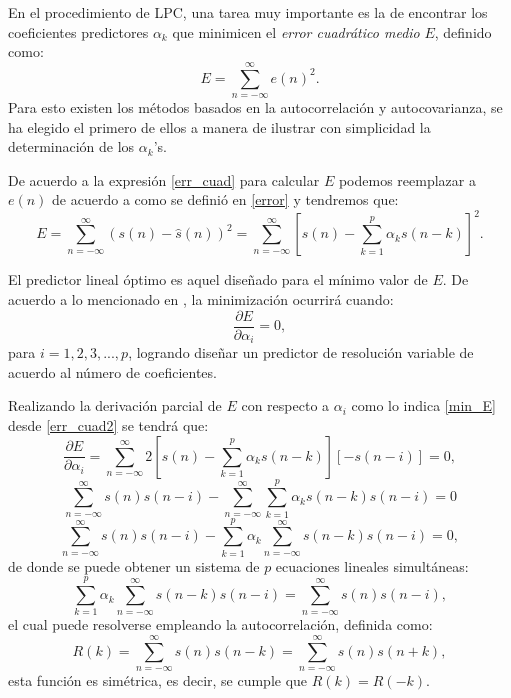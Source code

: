 En el procedimiento de LPC, una tarea muy importante es la de encontrar los coeficientes predictores $\alpha_k$ que minimicen el \emph{error cuadrático medio} $E$, definido como:
\begin{equation}\label{err_cuad}
E=\sum_{n=-\infty}^\infty e(n)^2.
\end{equation}
Para esto existen los métodos basados en la autocorrelación y autocovarianza, se ha elegido el primero de ellos a manera de ilustrar con simplicidad la determinación de los $\alpha_k$'s.

De acuerdo a la expresión \eqref{err_cuad} para calcular $E$ podemos reemplazar a $e(n)$ de acuerdo a como se definió en \eqref{error} y tendremos que:
\begin{equation}\label{err_cuad2}
E = \sum_{n=-\infty}^\infty (s(n)-\hat{s}(n))^2 = \sum_{n=-\infty}^\infty \left[s(n)- \sum_{k=1}^p \alpha_k s(n-k) \right]^2.
\end{equation}

El predictor lineal óptimo es aquel diseñado para el mínimo valor de $E$. De acuerdo a lo mencionado en \cite{Makhoul1975}, la minimización ocurrirá cuando: 
\begin{equation}\label{min_E}
\frac{\partial E}{\partial \alpha_i}=0,
\end{equation}
para $i=1,2,3,...,p$, logrando diseñar un predictor de resolución variable de acuerdo al número de coeficientes.

Realizando la derivación parcial de $E$ con respecto a $\alpha_i$ como lo indica \eqref{min_E} desde \eqref{err_cuad2} se tendrá que:
$$\frac{\partial E}{\partial \alpha_i}=\sum_{n=-\infty}^\infty 2\left[s(n)- \sum_{k=1}^p \alpha_k s(n-k) \right][-s(n-i)]=0,$$
$$\sum_{n=-\infty}^\infty s(n)s(n-i)-\sum_{n=-\infty}^\infty \sum_{k=1}^p \alpha_k s(n-k)s(n-i)=0$$
$$\sum_{n=-\infty}^\infty s(n)s(n-i)-\sum_{k=1}^p \alpha_k \sum_{n=-\infty}^\infty s(n-k)s(n-i)=0,$$
de donde se puede obtener un sistema de $p$ ecuaciones lineales simultáneas:
\begin{equation}\label{eqs}
\sum_{k=1}^p \alpha_k \sum_{n=-\infty}^\infty s(n-k)s(n-i)=\sum_{n=-\infty}^\infty s(n)s(n-i),
\end{equation}
el cual puede resolverse empleando la autocorrelación, definida como:
\begin{equation}\label{autocorrelacion}
R(k) = \sum_{n=-\infty}^{\infty} s(n)s(n-k) = \sum_{n=-\infty}^{\infty} s(n)s(n+k) ,
\end{equation}
 esta función es simétrica, es decir, se cumple que $R(k)=R(-k)$.

